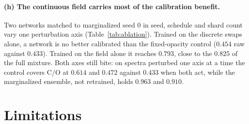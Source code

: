 \documentclass{article}
\begin{document}
\paragraph{(h) The continuous field carries most of the calibration benefit.}
Two networks matched to marginalized seed 0 in seed, schedule and shard count
vary one perturbation axis (Table~\ref{tab:ablation}). Trained on the
discrete swaps alone, a network is no better calibrated than the fixed-opacity
control ($0.454$ raw against $0.433$).
Trained on the field alone it reaches $0.793$, close to the
$0.825$ of the full mixture. Both axes still bite: on spectra perturbed one axis
at a time the control covers C/O at $0.614$ and $0.472$ against $0.433$ when
both act, while the marginalized ensemble, not retrained, holds $0.963$ and
$0.910$.

\FloatBarrier
\section{Limitations}
\label{sec:limits}
\end{document}
